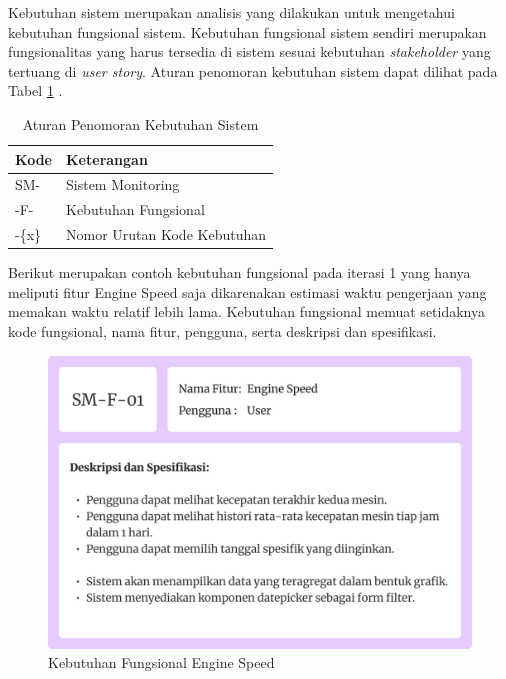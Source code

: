 Kebutuhan sistem merupakan analisis yang dilakukan untuk mengetahui kebutuhan fungsional sistem. Kebutuhan fungsional sistem sendiri merupakan fungsionalitas yang harus tersedia di sistem sesuai kebutuhan \textit{stakeholder} yang tertuang di \textit{user story}. Aturan penomoran kebutuhan sistem dapat dilihat pada Tabel \ref{tab:aturan-penomoran} .

\begin{table}[!h]
    \caption{Aturan Penomoran Kebutuhan Sistem}
    \centering
    \begin{tabular}
        {
            >{\centering\arraybackslash}p{}
            >{\centering\arraybackslash}p{}
        }
        \toprule

        Kode &
        Keterangan \\ [1ex]

        \midrule

        SM- & Sistem Monitoring \\
        -F- & Kebutuhan Fungsional \\
        -\{x\} & Nomor Urutan Kode Kebutuhan \\

        \bottomrule
    \end{tabular}
    \label{tab:aturan-penomoran}
\end{table}

\newpage

Berikut merupakan contoh kebutuhan fungsional pada iterasi 1 yang hanya meliputi fitur Engine Speed saja dikarenakan estimasi waktu pengerjaan yang memakan waktu relatif lebih lama. Kebutuhan fungsional memuat setidaknya kode fungsional, nama fitur, pengguna, serta deskripsi dan spesifikasi.

\begin{figure}[!h]
    \includegraphics[width=.8\linewidth, center]{images/hasil/iterations/1/fr-es.png}
    \caption{Kebutuhan Fungsional Engine Speed}
    \label{fig:fr-es}
\end{figure}

